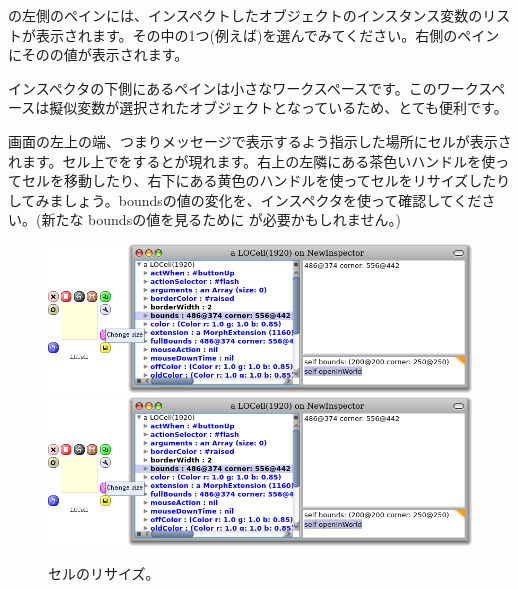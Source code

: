 \documentclass[a4paper,10pt,twoside]{book}
\begin{document}
の左側のペインには、インスペクトしたオブジェクトのインスタンス変数のリストが表示されます。その中の1つ(例えば\mbox{})を選んでみてください。右側のペインにそのの値が表示されます。


インスペクタの下側にあるペインは小さなワークスペースです。このワークスペースは擬似変数\self が選択されたオブジェクトとなっているため、とても便利です。


画面の左上の端、つまりメッセージで表示するよう指示した場所にセルが表示されます。セル上で\metaclick をするとが現れます。右上の左隣にある茶色いハンドルを使ってセルを移動したり、右下にある黄色のハンドルを使ってセルをリサイズしたりしてみましょう。boundsの値の変化を、インスペクタを使って確認してください。(新たな boundsの値を見るために  \actclick が必要かもしれません。)

\begin{figure}[htbp]
\centering
\ifluluelse
	{\includegraphics[width=\textwidth]{LOCellResize} }
	{\includegraphics[scale=0.7]{LOCellResize} }
\caption{セルのリサイズ。}
\end{figure}
\end{document}
